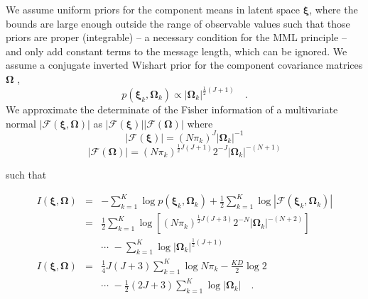 \documentclass[twocolumn]{aastex62}
\newcommand{\vect}[1]{\boldsymbol{\mathbf{#1}}}
\renewcommand{\vec}[1]{\vect{#1}}
\newcommand{\weight}{\pi}
\newcommand{\scoremeans}{\vec\xi}
\newcommand{\scorecovs}{\vec\Omega}
\newcommand{\NumData}{N}
\newcommand{\NumLatentFactors}{J}
\newcommand{\NumComponents}{K}
\newcommand{\numcomponents}{k}
\begin{document}
We assume uniform priors for the component means in latent space $\scoremeans$, 
where the bounds are large enough outside the range of observable values such
that those priors are proper (integrable) -- a necessary condition for the MML principle -- 
and only add constant terms to the message length, which can be ignored. We assume 
a conjugate inverted Wishart prior for the component covariance matrices
$\scorecovs$ \citep[Section 5.2.3;][]{Knorr-Held:2000},
\begin{equation}
	p(\scoremeans_\numcomponents,\scorecovs_\numcomponents) \propto |\scorecovs_\numcomponents|^{\frac{1}{2}(\NumLatentFactors + 1)} \quad .
\end{equation}
We approximate the determinate of the Fisher information of a multivariate normal $|\mathcal{F}(\scoremeans,\scorecovs)|$
as $|\mathcal{F}(\scoremeans)||\mathcal{F}(\scorecovs)|$ \citep{Oliver:1996,Figueiredo:2002} where
\begin{equation}
	|\mathcal{F}(\scoremeans)| = (\NumData\weight_k)^\NumLatentFactors|\scorecovs_k|^{-1}
\end{equation}
\begin{equation}
	|\mathcal{F}(\scorecovs)| = (\NumData\weight_k)^{\frac{1}{2}\NumLatentFactors(\NumLatentFactors+1)}2^{-\NumLatentFactors}|\scorecovs_k|^{-(\NumData+1)}
\end{equation}

\noindent{}such that 

\begin{eqnarray}
	I(\scoremeans,\scorecovs) &=& -\sum_{\numcomponents=1}^{\NumComponents}\log{p(\scoremeans_k,\scorecovs_k)} + \frac{1}{2}\sum_{\numcomponents=1}^{\NumComponents}\log{|\mathcal{F}(\scoremeans_k,\scorecovs_k)|} \nonumber \\
	&=& \frac{1}{2}\sum_{\numcomponents=1}^{\NumComponents}\log\left[(\NumData\weight_k)^{\frac{1}{2}\NumLatentFactors(\NumLatentFactors+3)}2^{-\NumData}|\scorecovs_k|^{-(\NumData + 2)}\right] \nonumber \\
	&& \cdots \,\, -\sum_{\numcomponents=1}^{\NumComponents}\log{|\scorecovs_k|}^{\frac{1}{2}(\NumLatentFactors + 1)} \\
I(\scoremeans,\scorecovs) &=& \frac{1}{4}\NumLatentFactors(\NumLatentFactors+3)\sum_{\numcomponents=1}^\NumComponents\log{\NumData\weight_k} - \frac{KD}{2}\log{2} \nonumber \\ 
&& \cdots \,\, -\frac{1}{2}(2\NumLatentFactors+3)\sum_{k=1}^{K}\log{|\scorecovs_k|}  \quad . \label{eq:prior_xi_omega} 
\end{eqnarray}
\end{document}
